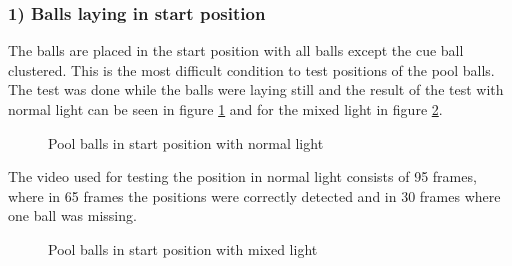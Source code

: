 \subsubsection{ 1) Balls laying in start position}
The balls are placed in the start position with all balls except the cue ball clustered. This is the most difficult condition to test positions of the pool balls. The test was done while the balls were laying still and the result of the test with normal light can be seen in figure \ref{fig:poolposstart} and for the mixed light in figure \ref{fig:poolposstart2}.

\begin{figure}[H]
  \centering
\quad
\quad
   \caption{Pool balls in start position with normal light}
  \label{fig:poolposstart}
\end{figure}

The video used for testing the position in normal light consists of 95 frames, where in 65 frames the positions were correctly detected and in 30 frames where one ball was missing.

\begin{figure}[H]
  \centering
\quad
\quad
   \caption{Pool balls in start position with mixed light}
  \label{fig:poolposstart2}
\end{figure}

